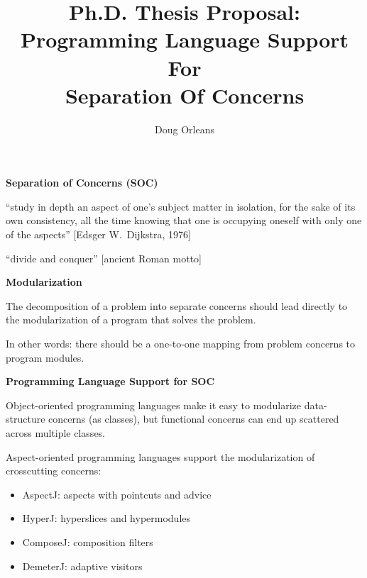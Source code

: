 \documentclass[landscape]{slides}
\title{Ph.D. Thesis Proposal: \\
Programming Language Support For\\
Separation Of Concerns}
\author{Doug Orleans}
\begin{document}
\maketitle

\sloppy %

\newcommand{\defn}[1]{\textbf{#1}}
\newcommand{\code}[1]{\texttt{#1}}
\newcommand{\parm}[1]{\textrm{\small\textit{#1}}}
\newcommand{\slidetitle}[1]{\begin{center}\textbf{#1}\end{center}}

\newenvironment{bullets}{
\begin{itemize}
\setlength{\itemsep}{0pt}
\setlength{\topsep}{0pt}
}{\end{itemize}}

\begin{slide}
\slidetitle{Separation of Concerns (SOC)}
``study in depth an aspect of one's subject matter in isolation, for
the sake of its own consistency, all the time knowing that one is
occupying oneself with only one of the aspects''
[Edsger W.~Dijkstra, 1976]

``divide and conquer'' [ancient Roman motto]
\end{slide}

\begin{slide}
\slidetitle{Modularization}
The decomposition of a problem into separate concerns should lead
directly to the modularization of a program that solves the
problem.

In other words: there should be a one-to-one mapping from problem
concerns to program modules.
\end{slide}

\begin{slide}
\slidetitle{Programming Language Support for SOC}
Object-oriented programming languages make it easy to modularize
data-structure concerns (as classes), but functional concerns can end
up scattered across multiple classes.

Aspect-oriented programming languages support the modularization of
crosscutting concerns:
\begin{bullets}
\item AspectJ: aspects with pointcuts and advice
\item HyperJ: hyperslices and hypermodules
\item ComposeJ: composition filters
\item DemeterJ: adaptive visitors
\end{bullets}
\end{slide}
\end{document}
